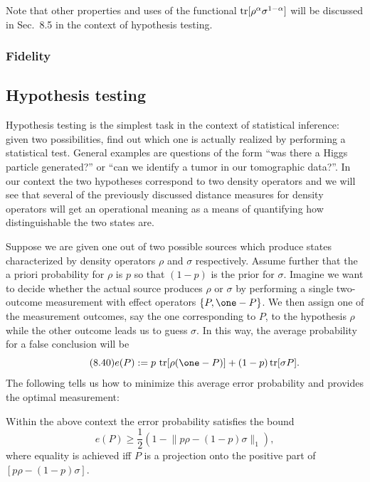\documentclass[11pt,a4paper]{article}
\theoremstyle{plain}
\theoremstyle{definition}
\theoremstyle{remark}
\begin{document}
Note that other properties and uses of the functional $\operatorname{tr}[\rho^\alpha\sigma^{1-\alpha}]$ will be discussed in Sec.~8.5 in the context of hypothesis testing.

\subsubsection{Fidelity}

\subsection{Hypothesis testing}

Hypothesis testing is the simplest task in the context of statistical inference:
given two possibilities, find out which one is actually realized by performing
a statistical test. General examples are questions of the form ``was there a
Higgs particle generated?'' or ``can we identify a tumor in our tomographic
data?''. In our context the two hypotheses correspond to two density operators
and we will see that several of the previously discussed distance measures for
density operators will get an operational meaning as a means of quantifying how
distinguishable the two states are.

Suppose we are given one out of two possible sources which produce states
characterized by density operators $\rho$ and $\sigma$ respectively. Assume further that
the a priori probability for $\rho$ is $p$ so that $(1-p)$ is the prior for $\sigma$. Imagine
we want to decide whether the actual source produces $\rho$ or $\sigma$ by performing
a single two-outcome measurement with effect operators $\{P,\one-P\}$. We then
assign one of the measurement outcomes, say the one corresponding to $P$, to
the hypothesis $\rho$ while the other outcome leads us to guess $\sigma$. In this way, the
average probability for a false conclusion will be
\begin{equation}\tag{8.40}
    e(P) := p\,\tr[\rho(\one-P)] + (1-p)\tr[\sigma P].
\end{equation}
The following tells us how to minimize this average error probability and provides the optimal measurement:

\begin{theorem}
    Within the above context the error probability satisfies the bound
    \begin{equation}\tag{8.41}
        e(P) \ge \frac{1}{2}\left(1-\bigl\|p\rho-(1-p)\sigma\bigr\|_1\right),
    \end{equation}
    where equality is achieved iff $P$ is a projection onto the positive part of $[p\rho-(1-p)\sigma]$.
\end{theorem}
\end{document}
